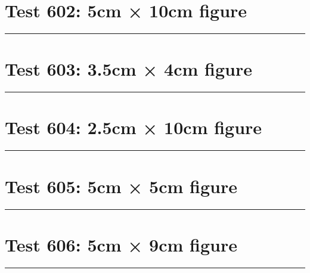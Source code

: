 \documentclass[a4paper,11pt]{article}
\begin{document}
\section*{Test 602: 5cm × 10cm figure}
\begin{swarmwrap}%
  \begin{minipage}[t]{5cm}
    \centering
    \rule{\linewidth}{10cm}
  \end{minipage}%
\end{swarmwrap}%
\swarmwrapnext
\lipsum[108]
\lipsum[109]
\lipsum[110]
\lipsum[111]
\lipsum[112]
\section*{Test 603: 3.5cm × 4cm figure}
\begin{swarmwrap}%
  \begin{minipage}[t]{3cm}
    \centering
    \rule{\linewidth}{4cm}
  \end{minipage}%
\end{swarmwrap}%
\swarmwrapnext
\lipsum[98]
\lipsum[99]
\lipsum[100]
\lipsum[101]
\lipsum[102]
\section*{Test 604: 2.5cm × 10cm figure}
\begin{swarmwrap}%
  \begin{minipage}[t]{2cm}
    \centering
    \rule{\linewidth}{10cm}
  \end{minipage}%
\end{swarmwrap}%
\swarmwrapnext
\lipsum[63]
\lipsum[64]
\lipsum[65]
\lipsum[66]
\lipsum[67]
\lipsum[68]
\section*{Test 605: 5cm × 5cm figure}
\begin{swarmwrap}%
  \begin{minipage}[t]{5cm}
    \centering
    \rule{\linewidth}{5cm}
  \end{minipage}%
\end{swarmwrap}%
\swarmwrapnext
\lipsum[38]
\lipsum[39]
\lipsum[40]
\lipsum[41]
\lipsum[42]
\section*{Test 606: 5cm × 9cm figure}
\begin{swarmwrap}%
  \begin{minipage}[t]{5cm}
    \centering
    \rule{\linewidth}{9cm}
  \end{minipage}%
\end{swarmwrap}%
\swarmwrapnext
\lipsum[145]
\lipsum[146]
\lipsum[147]
\end{document}
